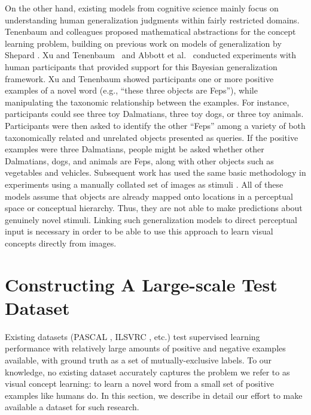 On the other hand, existing models from cognitive science mainly focus on understanding
human generalization judgments within fairly restricted domains. Tenenbaum
and colleagues \cite{tenenbaum99,tenenbaum2001generalization} proposed
mathematical abstractions for the concept learning problem, building on
previous work on models of generalization by Shepard \cite{shepard87}. Xu
and Tenenbaum~\cite{xu2007word} and Abbott et al.~\cite{abbottconstructing} conducted
experiments with human participants that provided support for this
Bayesian generalization framework. Xu and Tenenbaum \cite{xu2007word} showed participants one or more positive examples of a novel word (e.g., ``these three objects are Feps''), while manipulating the taxonomic relationship between the examples. For instance, participants could see three toy Dalmatians, three toy dogs, or three toy animals. Participants were then asked to identify the other ``Feps'' among a variety of both taxonomically related and unrelated objects presented as queries. If the positive examples were three Dalmatians, people might be asked whether other Dalmatians, dogs, and animals are Feps, along with other objects such as vegetables and vehicles. Subsequent work has used the same basic methodology in experiments using a manually collated set of images as stimuli \cite{abbottconstructing}. All of these models assume that objects
are already mapped onto locations in a perceptual space or conceptual
hierarchy. Thus, they are not able to make predictions about genuinely
novel stimuli. Linking such generalization models to direct perceptual
input is necessary in order to be able to use this approach to learn
visual concepts directly from images.




\section{Constructing A Large-scale Test Dataset}\label{sec:mechturk}

Existing datasets (PASCAL \cite{pascal}, ILSVRC \cite{ilsvrc}, etc.) test supervised learning performance with relatively large amounts of positive and negative examples available, with ground truth as a set of mutually-exclusive labels. To our knowledge, no existing dataset accurately captures the problem we refer to as visual concept learning: to learn a novel word from a small set of positive examples like humans do. In this section, we describe in detail our effort to make available a dataset for such research.

